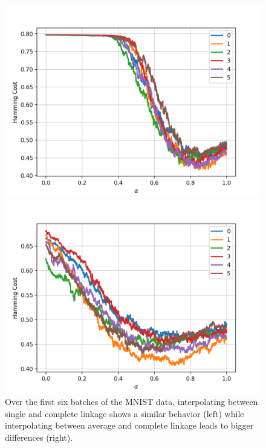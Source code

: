\begin{figure}[h]
\centering
\begin{minipage}{.45\textwidth}
  \centering
  \includegraphics[width=\linewidth]{plots/mnist_sc_all_batches}
\end{minipage}
\begin{minipage}{.45\textwidth}
  \centering
  \includegraphics[width=\linewidth]{plots/mnist_ac_all_batches}
\end{minipage}
\caption{Over the first six batches of the MNIST data, interpolating between single and complete linkage shows a similar behavior (left) while interpolating between average and complete linkage leads to bigger differences (right).}
\label{fig:mnistbatches}
\end{figure}

